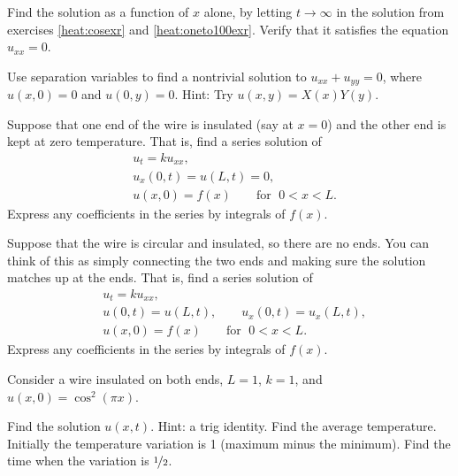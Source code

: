 \begin{exercise}
Find the \emph{} solution as a function
of $x$ alone,
by letting $t \to
\infty$ in the solution from
exercises \ref{heat:cosexr} and \ref{heat:oneto100exr}.
Verify that it satisfies the equation $u_{xx} = 0$.
\end{exercise}

\begin{exercise}
Use separation variables to find a nontrivial
solution to $u_{xx} + u_{yy} = 0$, where $u(x,0) = 0$ and $u(0,y) = 0$.
Hint: Try $u(x,y) = X(x)Y(y)$.
\end{exercise}

\begin{exercise}[challenging]
Suppose that one end of the wire is insulated (say at $x=0$) and
the other end is kept at zero temperature.  That is,
find a series solution of
\begin{align*}
& u_t = k u_{xx} , \\
& u_x(0,t) = u(L,t) = 0 , \\
& u(x,0) = f(x) \qquad \text{for } \; 0 < x < L .
\end{align*}
Express any coefficients in the series by integrals of $f(x)$.
\end{exercise}

\begin{exercise}[challenging]
Suppose that the wire is circular and insulated, so there are no ends. 
You can think of this as simply connecting the two ends and 
making sure the solution matches up at the ends.
That is, find a series solution of
\begin{align*}
& u_t = k u_{xx} , \\
& u(0,t) = u(L,t) , \qquad
u_x(0,t) = u_x(L,t) , \\
& u(x,0) = f(x) \qquad \text{for } \; 0 < x < L .
\end{align*}
Express any coefficients in the series by integrals of $f(x)$.
\end{exercise}

\begin{exercise}
Consider a wire insulated on both ends, $L=1$, $k=1$,
and $u(x,0) = \cos^2(\pi x)$.
\begin{tasks}
\task
Find the solution $u(x,t)$.  Hint: a trig identity.
\task
Find the average temperature.
\task
Initially the temperature variation is 1 (maximum minus the minimum).
Find the time when the variation is $\nicefrac{1}{2}$.
\end{tasks}
\end{exercise}

